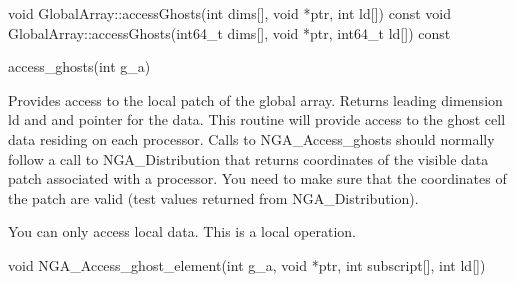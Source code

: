 \documentclass[12pt]{article}
\begin{document}
\begin{cxxapi}
\begin{cxxcode}
void GlobalArray::accessGhosts(int dims[], void *ptr, int ld[]) const
void GlobalArray::accessGhosts(int64_t dims[], void *ptr, int64_t ld[]) const
\end{cxxcode}
\begin{funcargs}
\end{funcargs}
\end{cxxapi}

\begin{pyapi}
\begin{pycode}
access_ghosts(int g_a)
\end{pycode}
\begin{funcargs}
\end{funcargs}
\end{pyapi}

\begin{desc}

  Provides access to the local patch of the global array. Returns
  leading dimension ld and and pointer for the data.  This routine
  will provide access to the ghost cell data residing on each
  processor. Calls to NGA_Access_ghosts should normally follow a call
  to NGA_Distribution that returns coordinates of the visible data
  patch associated with a processor. You need to make sure that the
  coordinates of the patch are valid (test values returned from
  NGA_Distribution).

You can only access local data.
This is a local operation.

\end{desc}


\begin{capi}
\begin{ccode}
void NGA_Access_ghost_element(int g_a, void *ptr, int subscript[],
                              int ld[])
\end{ccode}
\begin{funcargs}
\end{funcargs}
\end{capi}
\end{document}
